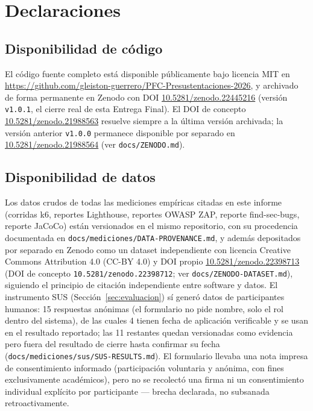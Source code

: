 \section*{Declaraciones}

\subsection*{Disponibilidad de código}
El código fuente completo está disponible públicamente bajo licencia MIT en
\url{https://github.com/gleiston-guerrero/PFC-Presustentaciones-2026}, y archivado de forma permanente
en Zenodo con DOI \href{https://doi.org/10.5281/zenodo.22445216}{10.5281/zenodo.22445216} (versión
\texttt{v1.0.1}, el cierre real de esta Entrega Final). El DOI de concepto
\href{https://doi.org/10.5281/zenodo.21988563}{10.5281/zenodo.21988563} resuelve siempre a la
última versión archivada; la versión anterior \texttt{v1.0.0} permanece disponible por separado en
\href{https://doi.org/10.5281/zenodo.21988564}{10.5281/zenodo.21988564} (ver \texttt{docs/ZENODO.md}).

\subsection*{Disponibilidad de datos}
Los datos crudos de todas las mediciones empíricas citadas en este informe (corridas k6, reportes
Lighthouse, reportes OWASP ZAP, reporte find-sec-bugs, reporte JaCoCo) están versionados en el mismo
repositorio, con su procedencia documentada en \texttt{docs/mediciones/DATA-PROVENANCE.md}, y además
depositados por separado en Zenodo como un dataset independiente con licencia Creative Commons
Attribution 4.0 (CC-BY 4.0) y DOI propio
\href{https://doi.org/10.5281/zenodo.22398713}{10.5281/zenodo.22398713} (DOI de concepto
\texttt{10.5281/zenodo.22398712}; ver \texttt{docs/ZENODO-DATASET.md}), siguiendo el principio de
citación independiente entre software y datos. El instrumento SUS (Sección~\ref{sec:evaluacion}) sí
generó datos de participantes humanos: 15 respuestas anónimas (el formulario no pide nombre, solo el rol
dentro del sistema), de las cuales 4 tienen fecha de aplicación verificable y se usan en el resultado
reportado; las 11 restantes quedan versionadas como evidencia pero fuera del resultado de cierre hasta
confirmar su fecha (\texttt{docs/mediciones/sus/SUS-RESULTS.md}). El formulario llevaba una nota impresa
de consentimiento informado (participación voluntaria y anónima, con fines exclusivamente académicos),
pero no se recolectó una firma ni un consentimiento individual explícito por participante --- brecha
declarada, no subsanada retroactivamente.

